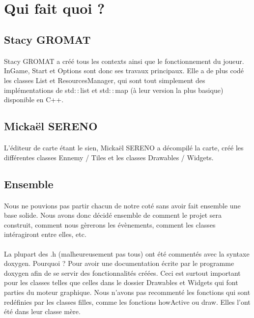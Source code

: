 ﻿\section{Qui fait quoi ?}

\subsection{Stacy GROMAT}
\paragraph{} Stacy GROMAT a créé tous les contexts ainsi que le fonctionnement du joueur. InGame, Start et Options sont donc ses travaux principaux. Elle a de plus codé les classes List et ResourcesManager, qui sont tout simplement des implémentations de std$::$list et std$::$map (à leur version la plus basique) disponible en C++. 

\subsection{Mickaël SERENO}
\paragraph{} L'éditeur de carte étant le sien, Mickaël SERENO a décompilé la carte, créé les différentes classes Ennemy / Tiles et les classes Drawables / Widgets.

\subsection{Ensemble}
\paragraph{} Nous ne pouvions pas partir chacun de notre coté sans avoir fait ensemble une base solide. Nous avons donc décidé ensemble de comment le projet sera construit, comment nous gèrerons les évènements, comment les classes intéragiront entre elles, etc.
\paragraph{} La plupart des .h (malheureusement pas tous) ont été commentés avec la syntaxe doxygen. Pourquoi ? Pour avoir une documentation écrite par le programme doxygen afin de se servir des fonctionnalités créées. Ceci est surtout important pour les classes telles que celles dans le dossier Drawables et Widgets qui font parties du moteur graphique. Nous n'avons pas recommenté les fonctions qui sont redéfinies par les classes filles, comme les fonctions howActive ou draw. Elles l'ont été dans leur classe mère.

